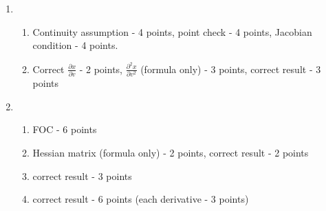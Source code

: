 \begin{enumerate}
  \item 
      \begin{enumerate} 
          \item
Continuity assumption - 4 points,
point check - 4 points,
Jacobian condition - 4 points.
          \item
Correct $\frac{\partial x}{\partial v}$  - 2 points,
$\frac{\partial ^2 x}{\partial v^2}$ (formula only) - 3 points,
correct result - 3 points
      \end{enumerate}
  \item 
      \begin{enumerate} 
              \item
FOC - 6 points
\item
Hessian matrix (formula only) - 2 points, correct result - 2 points
\item
correct result - 3 points
\item
correct result - 6 points (each derivative - 3 points)
      \end{enumerate}


\end{enumerate}
